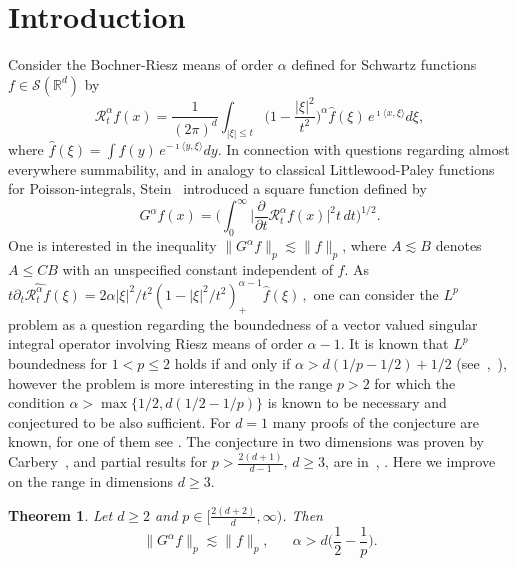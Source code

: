 \documentclass[11pt]{amsart}
\newtheorem{theorem}{Theorem}[section]
\theoremstyle{definition}
\numberwithin{theorem}{section}
\numberwithin{definition}{section}
\def\im{\imath}
\def\inn#1#2{\langle#1,#2\rangle}
\newcommand{\Be}{\begin{equation}}
\newcommand{\Ee}{\end{equation}}
\newcommand{\note}[1]{\footnote{\texttt{\Small #1}}}
\def\inn#1#2{\langle#1,#2\rangle}
\def\lc{\lesssim}
\def\fS{{\mathfrak {S}}}
\def\bbR{{\mathbb {R}}}
\def\cR{{\mathcal {R}}}
\def\cS{{\mathcal {S}}}
\begin{document}
\section{Introduction}\label{intro}
Consider the  Bochner-Riesz means of order $\alpha$
defined for
Schwartz functions $f\in\cS(\bbR^d)$ by
$$ \cR^\alpha_t f(x)= \frac{1}{(2\pi)^{d}}\int_{|\xi|\le t}
\Big(1-\frac{|\xi|^2}{t^2}\Big)^\alpha\widehat f(\xi)\,e^{\im
\inn{x}{\xi}} d\xi,$$ where  $\widehat f (\xi)=\int f(y)\,e^{-\im
\inn{y}{\xi}}dy$.
In connection with questions regarding
almost everywhere summability,
and in analogy to classical Littlewood-Paley functions
for Poisson-integrals,
Stein~\cite{stein58} introduced  a  square function
defined by
$$G^\alpha\! f(x)=
\Big(\int_0^\infty \Big|\frac{\partial}{\partial t} \cR^\alpha_t f(x)
\Big|^2 t\,dt
\Big)^{1/2}.
$$
One is  interested in the inequality
$\|G^\alpha \!f\|_p\lc \|f\|_p$,
where
$A\lc B$
denotes $A\le C B$ with an unspecified constant
independent of $f$.
As $t\partial_t\widehat{\cR^\alpha_t f}(\xi)=2\alpha |\xi|^2/t^2
(1-|\xi|^2/t^2)^{\alpha-1}_+\widehat f(\xi)\,,$
one can
consider the $L^p$ problem  as a question regarding the boundedness of
a  vector valued singular integral operator involving Riesz means of order
 $\alpha-1$. It is known that $L^p$ boundedness for  $1<p\le 2$ holds
 if and only if  $\alpha>d(1/p-1/2)+1/2$ (see~\cite{su1},~\cite{igku}),
however
 the problem is more interesting in  the range $p>2$ for which
the condition $\alpha> \max\{1/2, d(1/2-1/p)\}$ is known to be necessary
and  conjectured to be  also sufficient.
For $d=1$ many proofs of the conjecture are known,
for one of them see \cite{su2}.  The conjecture in two dimensions was
proven by Carbery~\cite{ca},
 and partial results  for $p> \frac{2(d+1)}{d-1}$, $d\ge 3$,  are in~\cite{ch},
\cite{se0}. Here we improve on  the range in  dimensions $d\ge 3$.
\begin{theorem}
\label{steinsquarelp}
Let $d\ge 2$ and $p\in[\frac{2(d+2)}{d},\infty)$.
Then
\begin{equation*}\label{Lpsteinsquarefct}
\big\|G^\alpha \!f\|_p\lc \|f\|_p, \quad \text{ $\alpha>d\Big(\frac 12-\frac 1p\Big)$.}
\end{equation*}
\end{theorem}
\end{document}
